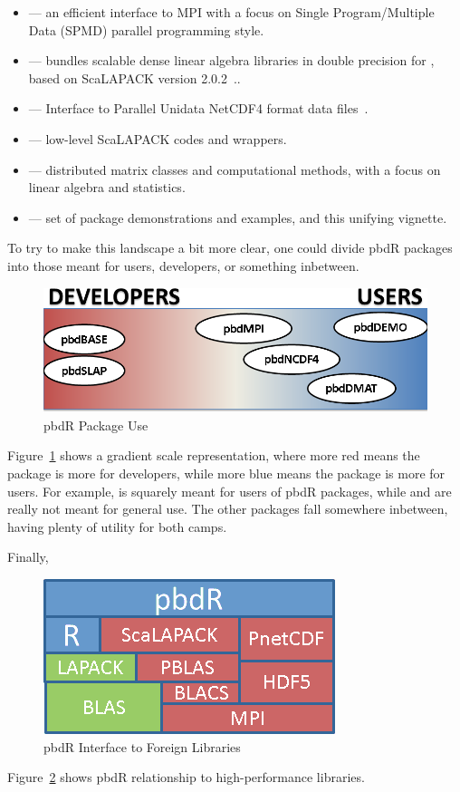 \begin{itemize}
 \item {} --- an efficient interface to MPI with a focus on Single Program/Multiple Data (SPMD) parallel programming style.
 \item {} --- bundles scalable dense linear algebra libraries in double precision for , based on ScaLAPACK version 2.0.2~\citep{slug}..
 \item {} --- Interface to Parallel Unidata NetCDF4 format data files~\citep{netcdf}.
 \item {} --- low-level ScaLAPACK codes and wrappers.
 \item {} --- distributed matrix classes and computational methods, with a focus on linear algebra and statistics.
 \item {} --- set of package demonstrations and examples, and this unifying vignette.
\end{itemize}

To try to make this landscape a bit more clear, one could divide pbdR packages into those meant for users, developers, or something inbetween.  
\begin{figure}[h]
 \centering
 \includegraphics[scale=.55]{pbdDEMO-include/pics/pbdR-packages.png}
 \caption{pbdR Package Use}
 \label{fig:pbdrpackages2}
\end{figure}
Figure~\ref{fig:pbdrpackages2} shows a gradient scale representation, where more red means the package is more for developers, while more blue means the package is more for users.  For example,  is squarely meant for users of pbdR packages, while  and  are really not meant for general use.  The other packages fall somewhere inbetween, having plenty of utility for both camps.

Finally, 
\begin{figure}[h]
 \centering
 \includegraphics[scale=.85]{pbdDEMO-include/pics/libs.png}
 \caption{pbdR Interface to Foreign Libraries}
 \label{fig:pbdrlibs}
\end{figure}
Figure~\ref{fig:pbdrlibs} shows pbdR relationship to high-performance libraries.


